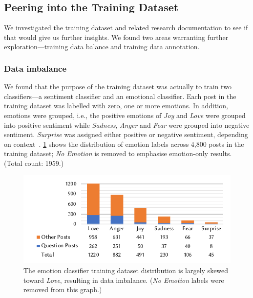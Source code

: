\subsection{Peering into the Training Dataset}
We investigated the training dataset and related research documentation to see if that would give us further insights.  We found two areas warranting further exploration---training data balance and training data annotation. 

\subsubsection{Data imbalance}
 We found that the purpose of the training dataset was actually to train two classifiers---a sentiment classifier and an emotional classifier.  Each post in the training dataset was labelled with zero, one or more emotions. In addition, emotions were grouped, i.e., the positive emotions of \textit{Joy} and \textit{Love} were grouped into positive sentiment while \textit{Sadness}, \textit{Anger} and \textit{Fear} were grouped into negative sentiment. \textit{Surprise} was assigned either positive or negative sentiment, depending on context~\citep{novielli2018, calefato2018}.  \cref{caise2021:fig:data-imbalance-training} shows the distribution of emotion labels across 4,800 posts in the training dataset; \textit{No Emotion} is removed to emphasise emotion-only results. (Total count: 1959.)

\begin{figure}
    \centering
    \includegraphics[width=.8\linewidth]{data-imbalance.pdf}
    \caption [Emotion classifier training data imbalance]{The emotion classifier training dataset distribution is largely skewed toward \textit{Love}, resulting in data imbalance. (\textit{No Emotion} labels were removed from this graph.)}
    \label{caise2021:fig:data-imbalance-training}
\end{figure} 

